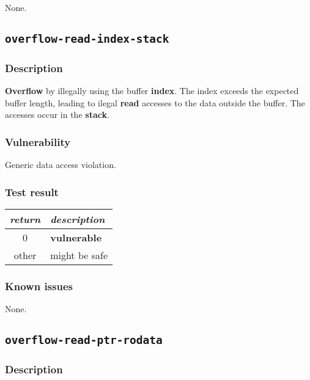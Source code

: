 \documentclass[a4paper]{book}
\begin{document}
None.

\newpage

\subsection{\texttt{overflow-read-index-stack}}\label{test-overflow-read-index-stack}

\subsubsection{Description}

\textbf{Overflow} by illegally using the buffer \textbf{index}.
The index exceeds the expected buffer length,
leading to ilegal \textbf{read} accesses to the data outside the buffer.
The accesses occur in the \textbf{stack}.

\subsubsection{Vulnerability}
Generic data access violation.

\subsubsection{Test result}

\begin{tabular}{cl}
  \toprule
  \emph{return}  & \emph{description} \\
  \midrule
  0              & \textbf{vulnerable} \\
  other          & might be safe \\
  \bottomrule
\end{tabular}

\subsubsection{Known issues}

None.

\newpage

\subsection{\texttt{overflow-read-ptr-rodata}}\label{test-overflow-read-ptr-rodata}

\subsubsection{Description}
\end{document}
